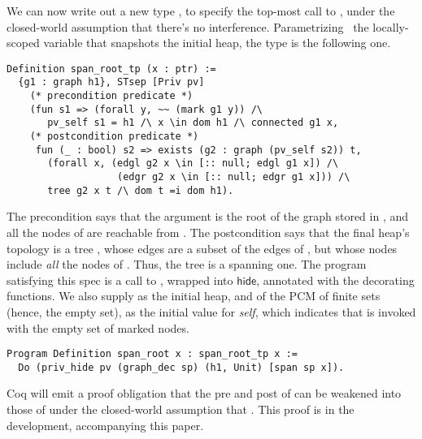 We can now write out a new type , to specify the
top-most call to , under the closed-world assumption that
there's no interference. Parametrizing \wrt~the locally-scoped
variable  that snapshots the initial heap, the type is
the following one.
%
\begin{lstlisting}
Definition span_root_tp (x : ptr) :=
  {g1 : graph h1}, STsep [Priv pv] 
    (* precondition predicate *)
    (fun s1 => (forall y, ~~ (mark g1 y)) /\
       pv_self s1 = h1 /\ x \in dom h1 /\ connected g1 x, 
    (* postcondition predicate *)
     fun (_ : bool) s2 => exists (g2 : graph (pv_self s2)) t, 
       (forall x, (edgl g2 x \in [:: null; edgl g1 x]) /\
                   (edgr g2 x \in [:: null; edgr g1 x])) /\
       tree g2 x t /\ dom t =i dom h1).
\end{lstlisting}
The precondition says that the argument \code{x} is the root of the
graph  stored in \code{h1}, and all the nodes of \code{g1}
are reachable from . 
%
The postcondition says that the final heap's topology is a tree
\code{t}, whose edges are a subset of the edges of , but
whose nodes include \emph{all} the nodes of . Thus, the tree
is a spanning one.
%
The program satisfying this spec is a call to , wrapped
into $\mathsf{hide}$, annotated with the decorating functions. We also
supply  as the initial heap, and  of the PCM of
finite sets (hence, the empty set), as the initial value for
\emph{self}, which indicates that \code{span} is invoked with the
empty set of marked nodes.
% 
\begin{lstlisting}
Program Definition span_root x : span_root_tp x := 
  Do (priv_hide pv (graph_dec sp) (h1, Unit) [span sp x]).  
\end{lstlisting}
%
Coq will emit a proof obligation that the pre and post of
\code{span_tp} can be weakened into those of  under
the closed-world assumption that . This proof is
in the development, accompanying this paper.
